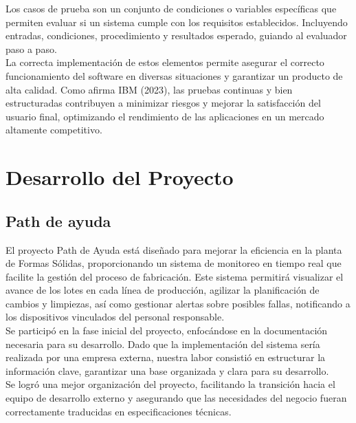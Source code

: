 \documentclass[12pt,letterpaper,spanish, xcolor=table]{report}
\numberwithin{figure}{subsection}
\begin{document}
Los casos de prueba son un conjunto de condiciones o variables específicas que permiten evaluar si un sistema cumple con los requisitos establecidos. Incluyendo entradas, condiciones, procedimiento y resultados esperado, guiando al evaluador paso a paso.\\

La correcta implementación de estos elementos permite asegurar el correcto funcionamiento del software en diversas situaciones y garantizar un producto de alta calidad. Como afirma IBM (2023), las pruebas continuas y bien estructuradas contribuyen a minimizar riesgos y mejorar la satisfacción del usuario final, optimizando el rendimiento de las aplicaciones en un mercado altamente competitivo.\\






\chapter{Desarrollo del Proyecto}
\newpage
	
\section{Path de ayuda}

	El proyecto Path de Ayuda está diseñado para mejorar la eficiencia en la planta de Formas Sólidas, proporcionando un sistema de monitoreo en tiempo real que facilite la gestión del proceso de fabricación. Este sistema permitirá visualizar el avance de los lotes en cada línea de producción, agilizar la planificación de cambios y limpiezas, así como gestionar alertas sobre posibles fallas, notificando a los dispositivos vinculados del personal responsable.\\
	
	Se participó en la fase inicial del proyecto, enfocándose en la documentación necesaria para su desarrollo. Dado que la implementación del sistema sería realizada por una empresa externa, nuestra labor consistió en estructurar la información clave, garantizar una base organizada y clara para su desarrollo.\\
	
	Se logró una mejor organización del proyecto, facilitando la transición hacia el equipo de desarrollo externo y asegurando que las necesidades del negocio fueran correctamente traducidas en especificaciones técnicas.
\end{document}
